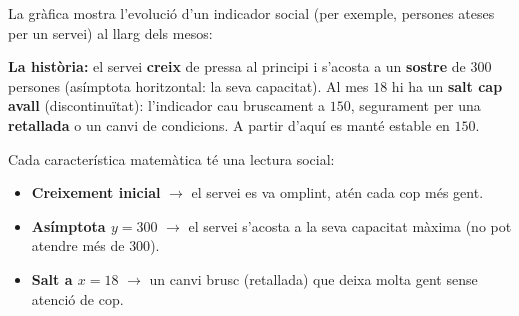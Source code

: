 \begin{exemple}
La gràfica mostra l'evolució d'un indicador social (per exemple, persones ateses per
un servei) al llarg dels mesos:

\begin{center}

\end{center}

\noindent\textbf{La història:} el servei \textbf{creix} de pressa al principi i
s'acosta a un \textbf{sostre} de $300$ persones (asímptota horitzontal: la seva
capacitat). Al mes $18$ hi ha un \textbf{salt cap avall} (discontinuïtat): l'indicador
cau bruscament a $150$, segurament per una \textbf{retallada} o un canvi de
condicions. A partir d'aquí es manté estable en $150$.
\end{exemple}

\begin{exemple}
Cada característica matemàtica té una lectura social:
\begin{itemize}[leftmargin=1.4em, itemsep=2pt]
  \item \textbf{Creixement inicial} $\rightarrow$ el servei es va omplint, atén cada cop
        més gent.
  \item \textbf{Asímptota $y=300$} $\rightarrow$ el servei s'acosta a la seva capacitat
        màxima (no pot atendre més de $300$).
  \item \textbf{Salt a $x=18$} $\rightarrow$ un canvi brusc (retallada) que deixa molta
        gent sense atenció de cop.
\end{itemize}
\end{exemple}

